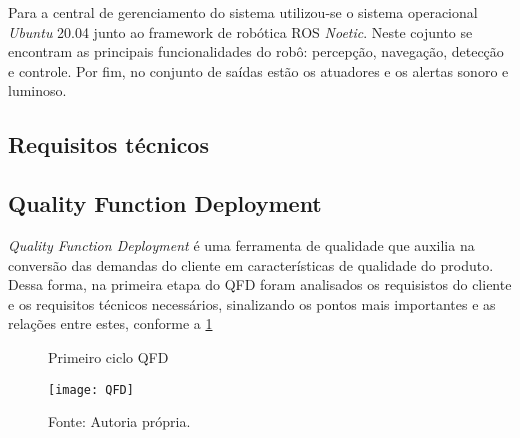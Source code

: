 Para a central de gerenciamento do sistema utilizou-se o sistema operacional \textit{Ubuntu} 20.04 junto ao framework de robótica ROS \textit{Noetic}. Neste cojunto se encontram as principais funcionalidades do robô: percepção, navegação, detecção e controle. Por fim, no conjunto de saídas estão os atuadores e os alertas sonoro e luminoso.

\subsection{Requisitos técnicos}

\subsection{Quality Function Deployment}
\textit{Quality Function Deployment} é uma ferramenta de qualidade que auxilia na conversão das demandas do cliente em características de qualidade do produto. Dessa forma, na primeira etapa do QFD foram analisados os requisistos do cliente e os requisitos técnicos necessários, sinalizando os pontos mais importantes e as relações entre estes, conforme a \ref{fig:QFD}

\begin{figure} [h!]	
    \centering

    \caption{ Primeiro ciclo QFD}
    \texttt{[image: QFD]}
    \caption*{Fonte: Autoria própria.}
    \label{fig:QFD}
\end{figure}






